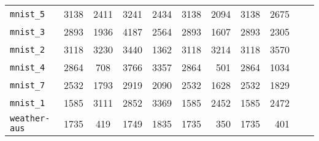 \begin{tabular}{lccrrrrrrrr}
\texttt{mnist\_5} & 3138 & 2411 & 3241 & 2434 & 3138 & 2094 & 3138 & 2675\\
\texttt{mnist\_3} & 2893 & 1936 & 4187 & 2564 & 2893 & 1607 & 2893 & 2305\\
\texttt{mnist\_2} & 3118 & 3230 & 3440 & 1362 & 3118 & 3214 & 3118 & 3570\\
\texttt{mnist\_4} & 2864 & 708 & 3766 & 3357 & 2864 & 501 & 2864 & 1034\\
\texttt{mnist\_7} & 2532 & 1793 & 2919 & 2090 & 2532 & 1628 & 2532 & 1829\\
\texttt{mnist\_1} & 1585 & 3111 & 2852 & 3369 & 1585 & 2452 & 1585 & 2472\\
\texttt{weather-aus} & 1735 & 419 & 1749 & 1835 & 1735 & 350 & 1735 & 401\\
\bottomrule
\end{tabular}
